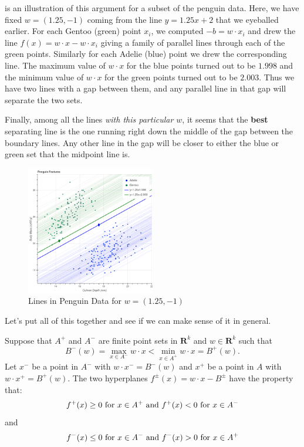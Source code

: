 \documentclass[
]{article}
\begin{document}
 is an illustration of this argument for a subset
of the penguin data. Here, we have fixed \(w=(1.25,-1)\) coming from the
line \(y=1.25x+2\) that we eyeballed earlier. For each Gentoo (green)
point \(x_{i}\), we computed \(-b=w\cdot x_{i}\) and drew the line
\(f(x) = w\cdot x - w\cdot x_{i}\) giving a family of parallel lines
through each of the green points. Similarly for each Adelie (blue) point
we drew the corresponding line. The maximum value of \(w\cdot x\) for
the blue points turned out to be \(1.998\) and the minimum value of
\(w\cdot x\) for the green points turned out to be \(2.003\). Thus we
have two lines with a gap between them, and any parallel line in that
gap will separate the two sets.

Finally, among all the lines \emph{with this particular \(w\)}, it seems
that the \textbf{best} separating line is the one running right down the
middle of the gap between the boundary lines. Any other line in the gap
will be closer to either the blue or green set that the midpoint line
is.

\begin{figure}
\hypertarget{fig:penguinhwy2}{%
\centering
\includegraphics[width=0.5\textwidth,height=\textheight]{../img/penguinhwy2.png}
\caption{Lines in Penguin Data for
\(w=(1.25,-1)\)}\label{fig:penguinhwy2}
}
\end{figure}

Let's put all of this together and see if we can make sense of it in
general.

Suppose that \(A^{+}\) and \(A^{-}\) are finite point sets in
\(\mathbf{R}^{k}\) and \(w\in\mathbf{R}^{k}\) such that \[
B^{-}(w)=\max_{x\in A^{-}}w\cdot x < \min_{x\in A^{+}}w\cdot x=B^{+}(w).
\] Let \(x^{-}\) be a point in \(A^{-}\) with \(w\cdot x^{-}=B^{-}(w)\)
and \(x^{+}\) be a point in \(A\) with \(w\cdot x^{+}=B^{+}(w)\). The
two hyperplanes \(f^{\pm}(x) = w\cdot x - B^{\pm}\) have the property
that: \[
f^{+}(x)\ge 0\hbox{ for }x\in A^{+}\hbox{ and }f^{+}(x)<0\hbox{ for }x\in A^{-}
\] and \[
f^{-}(x)\le 0\hbox{ for }x\in A^{-}\hbox{ and }f^{-}(x)>0\hbox{ for }x\in A^{+}
\]
\end{document}
